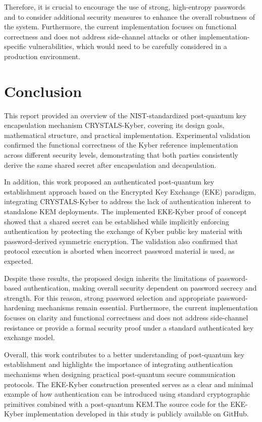 \documentclass[12pt]{article}
\begin{document}
Therefore, it is crucial to encourage the use of strong, high-entropy passwords and to consider additional security measures to enhance the overall robustness of the system. Furthermore, the current implementation focuses on functional correctness and does not address side-channel attacks or other implementation-specific vulnerabilities, which would need to be carefully considered in a production environment.

\newpage
\section{Conclusion}

This report provided an overview of the NIST-standardized post-quantum key encapsulation mechanism CRYSTALS-Kyber, covering its design goals, mathematical structure, and practical implementation. Experimental validation confirmed the functional correctness of the Kyber reference implementation across different security levels, demonstrating that both parties consistently derive the same shared secret after encapsulation and decapsulation.

In addition, this work proposed an authenticated post-quantum key establishment approach based on the Encrypted Key Exchange (EKE) paradigm, integrating CRYSTALS-Kyber to address the lack of authentication inherent to standalone KEM deployments. The implemented EKE-Kyber proof of concept showed that a shared secret can be established while implicitly enforcing authentication by protecting the exchange of Kyber public key material with password-derived symmetric encryption. The validation also confirmed that protocol execution is aborted when incorrect password material is used, as expected.

Despite these results, the proposed design inherits the limitations of password-based authentication, making overall security dependent on password secrecy and strength. For this reason, strong password selection and appropriate password-hardening mechanisms remain essential. Furthermore, the current implementation focuses on clarity and functional correctness and does not address side-channel resistance or provide a formal security proof under a standard authenticated key exchange model.

Overall, this work contributes to a better understanding of post-quantum key establishment and highlights the importance of integrating authentication mechanisms when designing practical post-quantum secure communication protocols. The EKE-Kyber construction presented serves as a clear and minimal example of how authentication can be introduced using standard cryptographic primitives combined with a post-quantum KEM.The source code for the EKE-Kyber implementation developed in this study is publicly available on GitHub\cite{InesMRibeiro2026}.
\newpage


\end{document}
